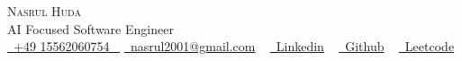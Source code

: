 \begin{center}
    {\Huge \scshape Nasrul Huda} \\ \vspace{1pt}
   AI Focused Software Engineer \\ \vspace{4pt}
    \small \href{tel:+917289968427}{\faMobile*\ +49 15562060754 ~} \href{mailto:nasrul2001@gmail.com}{\faEnvelope\  nasrul2001@gmail.com} ~ 
    \href{https://www.linkedin.com/in/nasrul-hudaa/}{\faLinkedin\ Linkedin}  ~
    \href{https://github.com/nnayz}{\faGithub\ Github} ~
    \href{https://leetcode.com/u/nnasrull/}{\faLink\ Leetcode}  ~
\end{center}
